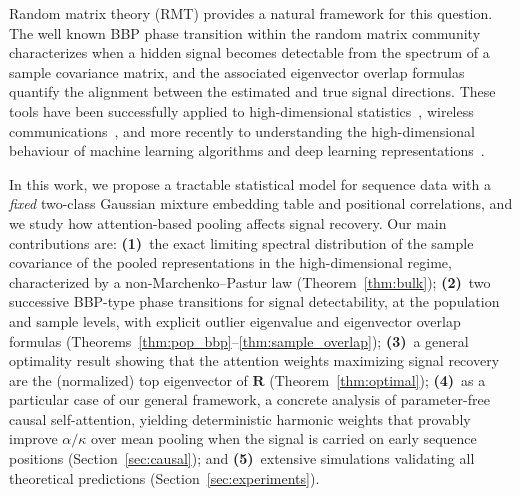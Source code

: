 \documentclass{article}
\def\mR{{\bm{R}}}
\begin{document}
Random matrix theory (RMT) provides a natural framework for this question. The well known BBP phase transition within the random matrix community~\citep{baik2005phase,baik2006eigenvalues} characterizes when a hidden signal becomes detectable from the spectrum of a sample covariance matrix, and the associated eigenvector overlap formulas~\citep{paul2007asymptotics,benaych2011eigenvalues} quantify the alignment between the estimated and true signal directions. These tools have been successfully applied to high-dimensional statistics~\citep{johnstone2001distribution,johnstone2009consistency}, wireless communications~\citep{couillet2011random}, and more recently to understanding the high-dimensional behaviour of machine learning algorithms and deep learning representations~\citep{pennington2017nonlinear,seddik2020random,loureiro2021learning,couillet2022random}.

In this work, we propose a tractable statistical model for sequence data with a \emph{fixed} two-class Gaussian mixture embedding table and positional correlations, and we study how attention-based pooling affects signal recovery. Our main contributions are:
\textbf{(1)}~the exact limiting spectral distribution of the sample covariance of the pooled representations in the high-dimensional regime, characterized by a non-Marchenko--Pastur law (Theorem~\ref{thm:bulk});
\textbf{(2)}~two successive BBP-type phase transitions for signal detectability, at the population and sample levels, with explicit outlier eigenvalue and eigenvector overlap formulas (Theorems~\ref{thm:pop_bbp}--\ref{thm:sample_overlap});
\textbf{(3)}~a general optimality result showing that the attention weights maximizing signal recovery are the (normalized) top eigenvector of $\mR$ (Theorem~\ref{thm:optimal});
\textbf{(4)}~as a particular case of our general framework, a concrete analysis of parameter-free causal self-attention, yielding deterministic harmonic weights that provably improve $\alpha/\kappa$ over mean pooling when the signal is carried on early sequence positions (Section~\ref{sec:causal}); and
\textbf{(5)}~extensive simulations validating all theoretical predictions (Section~\ref{sec:experiments}).
\end{document}
